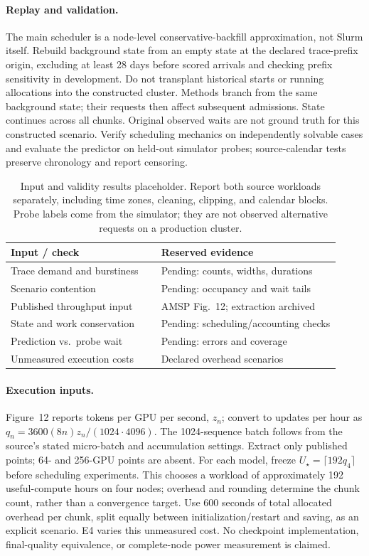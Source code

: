 \paragraph{Replay and validation.}
The main scheduler is a node-level conservative-backfill approximation, not
Slurm itself. Rebuild background state from an empty state at the declared
trace-prefix origin, excluding at least 28 days before scored arrivals and
checking prefix sensitivity in development. Do not transplant historical starts
or running allocations into the constructed cluster. Methods branch from the
same background state; their requests then affect subsequent admissions.
State continues across all chunks. Original observed waits are not ground
truth for this constructed scenario. Verify scheduling mechanics on
independently solvable cases and evaluate the predictor on held-out simulator
probes; source-calendar tests preserve chronology and report censoring.

\begin{table}[t]
\centering\small
\begin{tabular}{@{}p{0.42\linewidth}p{0.50\linewidth}@{}}
\toprule
Input / check & Reserved evidence \\
\midrule
Trace demand and burstiness & Pending: counts, widths, durations \\
Scenario contention & Pending: occupancy and wait tails \\
Published throughput input & AMSP Fig.\ 12; extraction archived \\
State and work conservation & Pending: scheduling/accounting checks \\
Prediction vs.\ probe wait & Pending: errors and coverage \\
Unmeasured execution costs & Declared overhead scenarios \\
\bottomrule
\end{tabular}
\caption{Input and validity results placeholder. Report both source workloads
separately, including time zones, cleaning, clipping, and calendar blocks.
Probe labels come from the simulator; they are not observed alternative
requests on a production cluster.}
\label{tab:validity}
\end{table}

\paragraph{Execution inputs.}
Figure~12 reports tokens per GPU per second, $z_n$; convert to updates per
hour as $q_n=3600(8n)z_n/(1024\cdot4096)$. The 1024-sequence batch follows
from the source's stated micro-batch and accumulation settings. Extract only
published points; 64- and 256-GPU points are absent. For each model, freeze
$U_\star=\lceil192q_4\rceil$ before scheduling experiments. This chooses a
workload of approximately 192 useful-compute hours on four nodes; overhead
and rounding determine the chunk count, rather than a convergence target. Use 600 seconds of total allocated overhead per chunk, split equally
between initialization/restart and saving, as an explicit scenario. E4 varies
this unmeasured cost. No checkpoint implementation, final-quality equivalence,
or complete-node power measurement is claimed.

